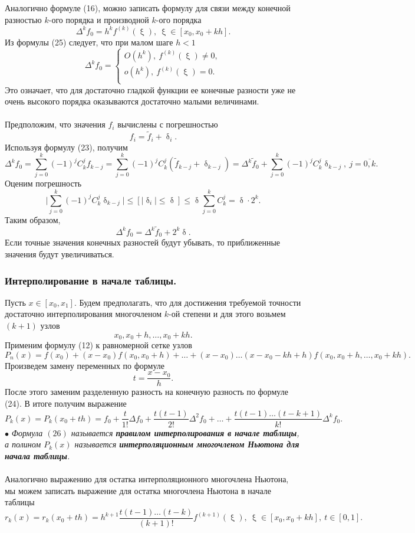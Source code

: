 \documentclass[a4paper, 12pt]{report}
\numberwithin{equation}{section}
\renewcommand{\leq}{\leqslant}
\renewcommand{\delta}{\updelta}
\renewcommand{\xi}{\upxi}
\begin{document}
	Аналогично формуле (16), можно записать формулу для связи между конечной разностью $k$-ого порядка и производной $k$-ого порядка 
	\begin{equation}
		\Delta^k f_0 = h^k f^{(k)}(\xi),\ \xi \in [x_0, x_0 + kh].
	\end{equation}
	Из формулы (25) следует, что при малом шаге $h<1$ $$\Delta^kf_0 =\begin{cases}
		O(h^k), \ f^{(k)}(\xi) \ne 0,\\
		o(h^k), \ f^{(k)}(\xi) = 0.\\
	\end{cases} $$
	Это означает, что для достаточно гладкой функции ее конечные разности уже не очень высокого порядка оказываются достаточно малыми величинами.\\\\
	Предположим, что значения $f_i$ вычислены с погрешностью $$f_i = \widetilde{f}_i + \delta _i.$$
	Используя формулу (23), получим $$\Delta^kf_0 = \sum_{j=0}^{k} (-1)^j C^j_k f_{k-j} = \sum_{j=0}^{k} (-1)^j C^j_k (\widetilde f_{k-j} + \delta_{k-j})= \Delta^k \widetilde f _0 + \sum_{j=0}^{k} (-1)^j C^j_k \delta_{k-j},\ j=\overline{0,k}.$$
	Оценим погрешность $$\Big| \sum_{j=0}^{k} (-1)^j C^j_k \delta_{k-j}\Big| \leq [|\delta_i|\leq \delta] \leq \delta \sum_{j=0}^{k} C_k^j = \delta \cdot 2^k.$$
	Таким образом, $$\Delta^kf_0= \Delta^k \widetilde f _0 + 2^k \delta.$$
	Если точные значения конечных разностей будут убывать, то приближенные значения будут увеличиваться. 
	\subsubsection{Интерполирование в начале таблицы.}
	Пусть $x \in [x_0, x_1]$. Будем предполагать, что для достижения требуемой точности достаточно интерполирования многочленом $k$-ой степени и для этого возьмем $(k+1)$ узлов $$x_0, x_0+h,\ldots, x_0+kh.$$
	Применим формулу (12) к равномерной сетке узлов $$P_n(x) = f(x_0) + (x-x_0)f(x_0, x_0+h) +\ldots + (x-x_0)\ldots (x-x_0-kh + h)f(x_0,x_0+h,\ldots, x_0 + kh).$$
	Произведем замену переменных по формуле $$t = \dfrac{x-x_0}{h}.$$ После этого заменим разделенную разность на конечную разность по формуле (24). В итоге получим выражение 
	\begin{equation}
		P_k(x) = P_k(x_0+th) = f_0 + \dfrac{t}{1!}\Delta f_0 + \dfrac{t(t-1)}{2!} \Delta^2f_0 + \ldots + \dfrac{t(t-1)\ldots (t-k+1)}{k!}\Delta^k f_0.
	\end{equation}
	$\bullet$ \textit{Формула $(26)$ называется \textbf{правилом интерполирования в начале таблицы}, а полином $P_k(x)$ называется \textbf{интерполяционным многочленом Ньютона для начала таблицы}.}\\\\
	Аналогично выражению для остатка интерполяционного многочлена Ньютона, мы можем записать выражение для остатка многочлена Ньютона в начале таблицы \begin{equation}
		r_k(x) = r_k(x_0 + th) = h^{k+1} \dfrac{t(t-1)\ldots (t-k)}{(k+1)!}f^{(k+1)}(\xi),\ \xi \in [x_0, x_0 + kh],\ t\in [0,1].
	\end{equation}
\end{document}
